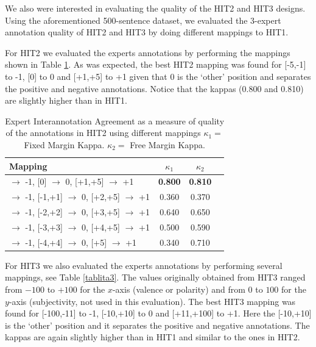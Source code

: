 \documentclass[11pt, a4paper,onecolumn]{article}
\begin{document}

We also were interested in evaluating the quality of the
HIT2 and HIT3 designs. Using the aforementioned 500-sentence dataset, we evaluated the 3-expert annotation quality of HIT2 and HIT3 by doing different mappings to HIT1.  

For HIT2 we evaluated the experts annotations by performing the mappings shown in Table \ref{tablita2}.
As was expected, the best HIT2 mapping was found for [-5,-1] to -1, [0] to 0 and [+1,+5] to +1 given that 0 is the `other' position and separates the positive and negative annotations. Notice that the kappas (0.800 and 0.810) are slightly higher than in HIT1.

\begin{table}[h]
\begin{center}
\begin{tabular}{|l|c|c|c|}
\hline
Mapping & $\kappa_{1}$ & $\kappa_{2}$ \\ 
\hline
[-5,-1] $\rightarrow$ -1, [0] $\rightarrow$ 0, [+1,+5] $\rightarrow$ +1& \textbf{0.800} & \textbf{0.810}\\ \hline
[-5,-2] $\rightarrow$ -1, [-1,+1] $\rightarrow$ 0, [+2,+5] $\rightarrow$ +1& 0.360 & 0.370\\ \hline
[-5,-3] $\rightarrow$ -1, [-2,+2] $\rightarrow$ 0, [+3,+5] $\rightarrow$ +1& 0.640 & 0.650\\ \hline
[-5,-4] $\rightarrow$ -1, [-3,+3] $\rightarrow$ 0, [+4,+5] $\rightarrow$ +1& 0.500 & 0.590\\ \hline
[-5] $\rightarrow$ -1, [-4,+4] $\rightarrow$ 0, [+5] $\rightarrow$ +1& 0.340 & 0.710\\ \hline
\end{tabular}
\end{center}
\caption{Expert Interannotation Agreement as a measure of quality of the annotations in HIT2 using different mappings $\kappa_{1} = $ Fixed Margin Kappa. $\kappa_{2} = $ Free Margin Kappa.}
\label{tablita2}
\end{table}


For HIT3 we also evaluated the experts annotations by performing several mappings, see Table \ref{tablita3}.  The values originally obtained from HIT3 ranged from $-100$ to $+100$ for the $x$-axis (valence or polarity) and from $0$ to $100$ for the $y$-axis (subjectivity, not used in this evaluation).
The best HIT3 mapping was found for [-100,-11] to -1, [-10,+10] to 0 and [+11,+100] to +1. Here the [-10,+10] is the `other' position and it separates the positive and negative annotations. The kappas are again slightly higher than in HIT1 and similar to the ones in HIT2.
\end{document}
